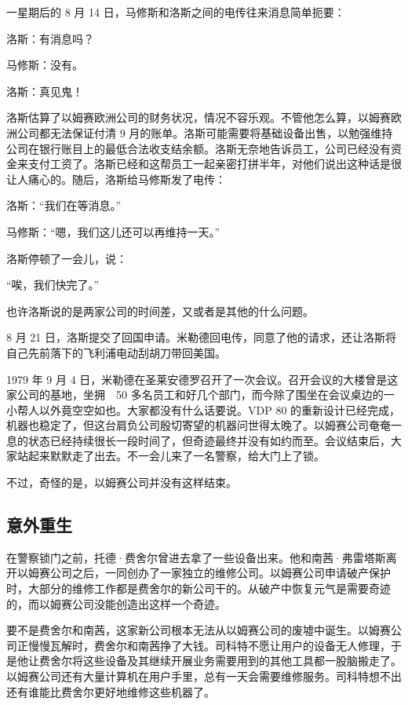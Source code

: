 \documentclass[12pt,UTF8]{ctexbook}
\begin{document}
一星期后的 8 月 14 日，马修斯和洛斯之间的电传往来消息简单扼要：

洛斯：有消息吗？

马修斯：没有。

洛斯：真见鬼！



洛斯估算了以姆赛欧洲公司的财务状况，情况不容乐观。不管他怎么算，以姆赛欧洲公司都无法保证付清 9 月的账单。洛斯可能需要将基础设备出售，以勉强维持公司在银行账目上的最低合法收支结余额。洛斯无奈地告诉员工，公司已经没有资金来支付工资了。洛斯已经和这帮员工一起亲密打拼半年，对他们说出这种话是很让人痛心的。随后，洛斯给马修斯发了电传：

洛斯：“我们在等消息。”

马修斯：“嗯，我们这儿还可以再维持一天。”



洛斯停顿了一会儿，说：

“唉，我们快完了。”



也许洛斯说的是两家公司的时间差，又或者是其他的什么问题。

8 月 21 日，洛斯提交了回国申请。米勒德回电传，同意了他的请求，还让洛斯将自己先前落下的飞利浦电动刮胡刀带回美国。

1979 年 9 月 4 日，米勒德在圣莱安德罗召开了一次会议。召开会议的大楼曾是这家公司的基地，坐拥　50 多名员工和好几个部门，而今除了围坐在会议桌边的一小帮人以外竟空空如也。大家都没有什么话要说。VDP 80 的重新设计已经完成，机器也稳定了，但这台肩负公司殷切寄望的机器问世得太晚了。以姆赛公司奄奄一息的状态已经持续很长一段时间了，但奇迹最终并没有如约而至。会议结束后，大家站起来默默走了出去。不一会儿来了一名警察，给大门上了锁。

不过，奇怪的是，以姆赛公司并没有这样结束。





\subsection{意外重生}


在警察锁门之前，托德·费舍尔曾进去拿了一些设备出来。他和南茜·弗雷塔斯离开以姆赛公司之后，一同创办了一家独立的维修公司。以姆赛公司申请破产保护时，大部分的维修工作都是费舍尔的新公司干的。从破产中恢复元气是需要奇迹的，而以姆赛公司没能创造出这样一个奇迹。

要不是费舍尔和南茜，这家新公司根本无法从以姆赛公司的废墟中诞生。以姆赛公司正慢慢瓦解时，费舍尔和南茜挣了大钱。司科特不愿让用户的设备无人修理，于是他让费舍尔将这些设备及其继续开展业务需要用到的其他工具都一股脑搬走了。以姆赛公司还有大量计算机在用户手里，总有一天会需要维修服务。司科特想不出还有谁能比费舍尔更好地维修这些机器了。
\end{document}
